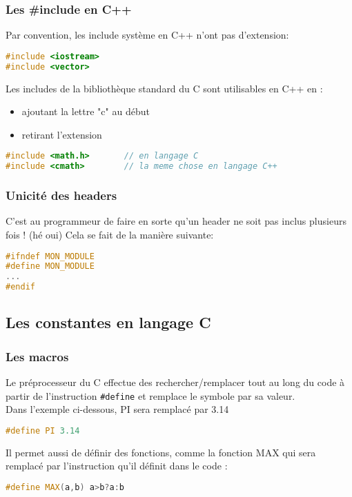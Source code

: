 \documentclass{beamer}
\begin{document}
\begin{frame}[fragile=singleslide,shrink=20]
\frametitle {Les \#include en C++}
Par convention, les include système en C++ n'ont pas d'extension:

\begin{lstlisting}[language=c++]
#include <iostream>
#include <vector>
\end{lstlisting}

Les includes de la bibliothèque standard du C sont utilisables en C++ en :
\begin{itemize}
\item{ajoutant la lettre "c" au début}
\item{retirant l'extension}
\end{itemize}

\begin{lstlisting}[language=c++]
#include <math.h>       // en langage C
#include <cmath>        // la meme chose en langage C++
\end{lstlisting}
\end{frame}

\begin{frame}[fragile=singleslide,shrink=20]
\frametitle {Unicité des headers}
C'est au programmeur de faire en sorte qu'un header ne soit pas inclus plusieurs fois ! (hé oui)
Cela se fait de la manière suivante:

\begin{lstlisting}[language=c++]
#ifndef MON_MODULE
#define MON_MODULE
...
#endif
\end{lstlisting}
\end{frame}

\subsection{Les constantes en langage C}

\begin{frame}[fragile=singleslide,shrink=20]
\frametitle {Les macros}


Le préprocesseur du C effectue des rechercher/remplacer tout au long du code à partir de l'instruction \texttt{\#define} et remplace le symbole par sa valeur. \\
Dans l'exemple ci-dessous, PI sera remplacé par 3.14

\begin{lstlisting}[language=c++]
#define PI 3.14
\end{lstlisting}

Il permet aussi de définir des fonctions, comme la fonction MAX qui sera remplacé par l'instruction qu'il définit dans le code :

\begin{lstlisting}[language=c++]
#define MAX(a,b) a>b?a:b
\end{lstlisting}


\end{frame}
\end{document}
